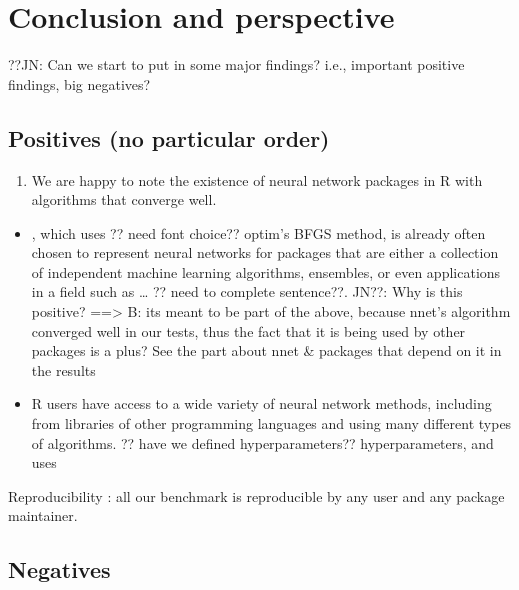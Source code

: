 \hypertarget{conclusion-and-perspective}{%
\section{Conclusion and perspective}\label{conclusion-and-perspective}}

??JN: Can we start to put in some major findings? i.e., important
positive findings, big negatives?

\hypertarget{positives-no-particular-order}{%
\subsection{Positives (no particular
order)}\label{positives-no-particular-order}}

\begin{enumerate}
\def\labelenumi{\arabic{enumi}.}
\tightlist
\item
  We are happy to note the existence of neural network packages in R
  with algorithms that converge well.
\end{enumerate}

\begin{itemize}
\tightlist
\item
  , which uses ?? need font choice?? optim's BFGS method, is
  already often chosen to represent neural networks for packages that
  are either a collection of independent machine learning algorithms,
  ensembles, or even applications in a field such as \ldots{} ?? need to
  complete sentence??. JN??: Why is this positive? ==\textgreater{} B:
  its meant to be part of the above, because nnet's algorithm converged
  well in our tests, thus the fact that it is being used by other
  packages is a plus? See the part about nnet \& packages that depend on
  it in the results
\item
  R users have access to a wide variety of neural network methods,
  including from libraries of other programming languages and using many
  different types of algorithms. ?? have we defined hyperparameters??
  hyperparameters, and uses
\end{itemize}

Reproducibility : all our benchmark is reproducible by any user and any
package maintainer.

\hypertarget{negatives}{%
\subsection{Negatives}\label{negatives}}

